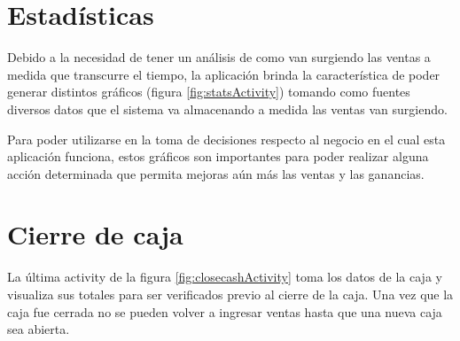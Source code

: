 
\section{Estad\'isticas}
\label{sec:ui.statistics}

Debido a la necesidad de tener un an\'alisis de como van surgiendo las ventas a medida que transcurre el tiempo, la aplicaci\'on brinda la caracter\'istica de poder generar distintos gr\'aficos (figura \ref{fig:statsActivity}) tomando como fuentes diversos datos que el sistema va almacenando a medida las ventas van surgiendo.

Para poder utilizarse en la toma de decisiones respecto al negocio en el cual esta aplicaci\'on funciona, estos gr\'aficos son importantes para poder realizar alguna acci\'on determinada que permita mejoras a\'un m\'as las ventas y las ganancias.


\section{Cierre de caja}
\label{sec:ui.closecash}

La \'ultima activity de la figura \ref{fig:closecashActivity} toma los datos de la caja y visualiza sus totales para ser verificados previo al cierre de la caja. Una vez que la caja fue cerrada no se pueden volver a ingresar ventas hasta que una nueva caja sea abierta.


